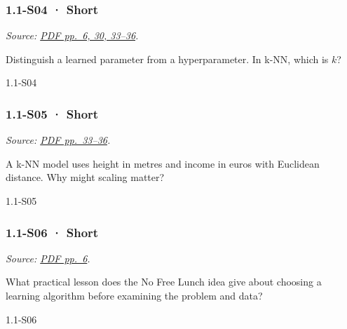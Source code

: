 \noindent\begin{minipage}{\linewidth}

\subsubsection{1.1-S04 · Short}\label{s04-short}

\emph{Source:
\href{../Lecture\%20Slides/1.1.\%20Fundamentals.pdf\#page=6}{PDF pp.~6,
30, 33--36}.}

Distinguish a learned parameter from a hyperparameter. In k-NN, which is
\(k\)?

\begin{solution}[20mm]{1.1-S04}

\end{solution}
\end{minipage}\par\medskip

\noindent\begin{minipage}{\linewidth}

\subsubsection{1.1-S05 · Short}\label{s05-short}

\emph{Source:
\href{../Lecture\%20Slides/1.1.\%20Fundamentals.pdf\#page=33}{PDF
pp.~33--36}.}

A k-NN model uses height in metres and income in euros with Euclidean
distance. Why might scaling matter?

\begin{solution}[20mm]{1.1-S05}

\end{solution}
\end{minipage}\par\medskip

\noindent\begin{minipage}{\linewidth}

\subsubsection{1.1-S06 · Short}\label{s06-short}

\emph{Source:
\href{../Lecture\%20Slides/1.1.\%20Fundamentals.pdf\#page=6}{PDF
pp.~6}.}

What practical lesson does the No Free Lunch idea give about choosing a
learning algorithm before examining the problem and data?

\begin{solution}[20mm]{1.1-S06}

\end{solution}
\end{minipage}\par\medskip

